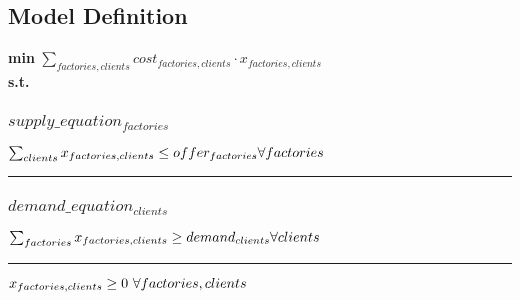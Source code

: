 \documentclass[11pt]{article}
\begin{document}
\subsection*{Model Definition}
\textbf{min} $\sum_{factories,clients} cost_{factories,clients} \cdot x_{factories,clients}$\\
\textbf{s.t.}
\subsubsection*{$supply\_equation_{factories}$}
$
\sum_{clients} x_{factories,clients} \leq offer_{factories}\hfill \forall factories
$
\vspace{5pt}
\hrule
\subsubsection*{$demand\_equation_{clients}$}
$
\sum_{factories} x_{factories,clients} \geq demand_{clients}\hfill \forall clients
$
\vspace{5pt}
\hrule
\bigskip
$x_{factories,clients}\geq 0 ~ \forall factories,clients\\$
\end{document}
